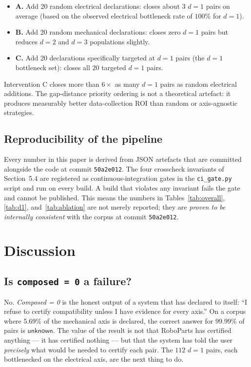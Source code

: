 \begin{itemize}[nosep,leftmargin=*]
\item \textbf{A.} Add 20 random electrical declarations: closes
about $3$ $d=1$ pairs on average (based on the observed
electrical bottleneck rate of $100\%$ for $d=1$).

\item \textbf{B.} Add 20 random mechanical declarations: closes
zero $d=1$ pairs but reduces $d=2$ and $d=3$ populations slightly.

\item \textbf{C.} Add 20 declarations specifically targeted at
$d=1$ pairs (the $d=1$ bottleneck set): closes all $20$ targeted
$d=1$ pairs.
\end{itemize}

Intervention C closes more than $6\times$ as many $d=1$ pairs as
random electrical additions. The gap-distance priority ordering
is not a theoretical artefact: it produces measurably better
data-collection ROI than random or axis-agnostic strategies.

\subsection{Reproducibility of the pipeline}

Every number in this paper is derived from JSON artefacts that
are committed alongside the code at commit
\texttt{50a2e012}. The four crosscheck invariants of
Section~5.4 are registered as continuous-integration gates in the
\texttt{ci\_gate.py} script and run on every build. A build that
violates any invariant fails the gate and cannot be published.
This means the numbers in Tables~\ref{tab:overall},
\ref{tab:d1}, and~\ref{tab:ablation} are not merely reported;
they are \emph{proven to be internally consistent} with the corpus
at commit \texttt{50a2e012}.

\section{Discussion}

\subsection{Is \texttt{composed = 0} a failure?}

No. \emph{Composed = 0} is the honest output of a system that has
declared to itself: ``I refuse to certify compatibility unless I have
evidence for every axis.'' On a corpus where 5.69\% of the mechanical
axis is declared, the correct answer for $99.99\%$ of pairs is
$\mathsf{unknown}$. The value of the result is not that RoboParts
has certified anything — it has certified nothing — but that the
system has told the user \emph{precisely} what would be needed to
certify each pair. The $112$ $d=1$ pairs, each bottlenecked on the
electrical axis, are the next thing to do.

